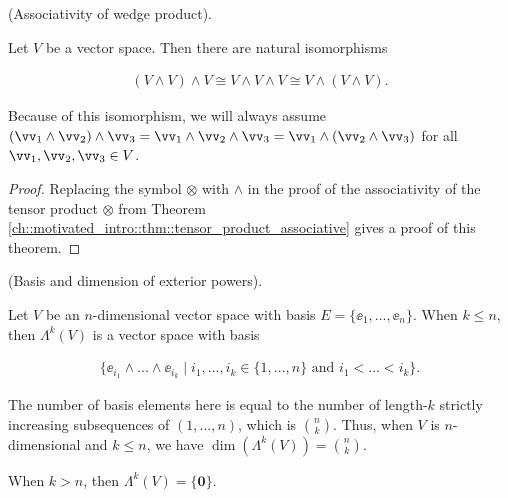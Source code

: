 \begin{theorem}
    (Associativity of wedge product). 
    
    Let $V$ be a vector space. Then there are natural isomorphisms
    
    \begin{align*}
        (V \wedge V) \wedge V \cong V \wedge V \wedge V \cong V \wedge (V \wedge V).
    \end{align*}

    Because of this isomorphism, we will always assume $(\vv_1 \wedge \vv_2) \wedge \vv_3 = \vv_1 \wedge \vv_2 \wedge \vv_3 = \vv_1 \wedge (\vv_2 \wedge \vv_3)$ for all $\vv_1, \vv_2, \vv_3 \in V$.
\end{theorem}

\begin{proof}
    Replacing the symbol $\otimes$ with $\wedge$ in the proof of the associativity of the tensor product $\otimes$ from Theorem \ref{ch::motivated_intro::thm::tensor_product_associative} gives a proof of this theorem. 
\end{proof}

\begin{theorem}
    (Basis and dimension of exterior powers).
    
    Let $V$ be an $n$-dimensional vector space with basis $E = \{\ee_1, ..., \ee_n\}$. When $k \leq n$, then $\Lambda^k(V)$ is a vector space with basis
    
    \begin{align*}
        \{ \ee_{i_1} \wedge ... \wedge \ee_{i_k} \mid i_1, ..., i_k \in \{1, ..., n\} \text{ and } i_1 < ... < i_k \}.
    \end{align*}

    The number of basis elements here is equal to the number of length-$k$ strictly increasing subsequences of $(1, ..., n)$, which is $\binom{n}{k}$. Thus, when $V$ is $n$-dimensional and $k \leq n$, we have $\dim(\Lambda^k(V)) = \binom{n}{k}$.

    When $k > n$, then $\Lambda^k(V) = \{\mathbf{0}\}$.
\end{theorem}

